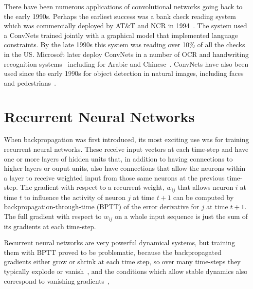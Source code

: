 \documentclass[10pts]{article}
\begin{document}
There have been numerous applications of convolutional networks going
back to the early 1990s. Perhaps the earliest success was a bank check
reading system which was commercially deployed by AT\&T and NCR in
1994~\cite{lecun-98}. The system used a ConvNets trained jointly with
a graphical model that implemented language constraints. By the late
1990s this system was reading over 10\% of all the checks in the
US. Microsoft later deploy ConvNets in a number of OCR and handwriting
recognition
systems~\cite{simard-03,chellapilla-ist-06,chellapilla-iwfhr-06b}
including for Arabic and
Chinese~\cite{abdulkader-iwfhr-06,chellapilla-iwfhr-06a}. ConvNets
have also been used since the early 1990s for object detection in
natural images, including faces and
pedestrians~\cite{vaillant-monrocq-lecun-94,garcia-delakis-04,osadchy-07,nasse-09,sermanet-cvpr-13}.




\section{Recurrent Neural Networks}

When backpropagation was first introduced, its most exciting use was for
training recurrent neural networks. These receive input vectors at each
time-step and have one or more layers of hidden units that, in addition to
having connections to higher layers or ouput units, also have connections
that allow the neurons within a layer to receive weighted input from those
same neurons at the previous time-step.  The gradient with respect to a recurrent
weight, $w_{ij}$ that allows neuron $i$ at time $t$ to influence the
activity of neuron $j$ at time $t+1$ can be computed by
backpropagation-through-time (BPTT) of the error derivative for $j$ at time
$t+1$. The full gradient with respect to $w_{ij}$ on a whole input sequence is just the
sum of its gradients at each time-step.

Recurrent neural networks are very powerful dynamical systems, but training
them with BPTT proved to be problematic, because the backpropagated
gradients either grow or shrink at each time step, so over many time-steps
they typically explode or vanish~\citep{Hochreiter91-small,Bengio-et-al-TNN1994},
and the conditions which allow stable dynamics also correspond to
vanishing gradients~\citep{Bengio-et-al-TNN1994},
\end{document}
